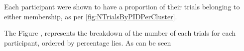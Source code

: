 \documentclass[man, floatsintext]{apa7}
\begin{document}
Each participant were shown to have a proportion of their trials belonging to either membership, as per \ref{fig:NTrialsByPIDPerCluster}. 


The Figure , represents the breakdown of the number of each trials for each participant, ordered by percentage lies. As can be seen




%
%
%
%
%
\end{document}
